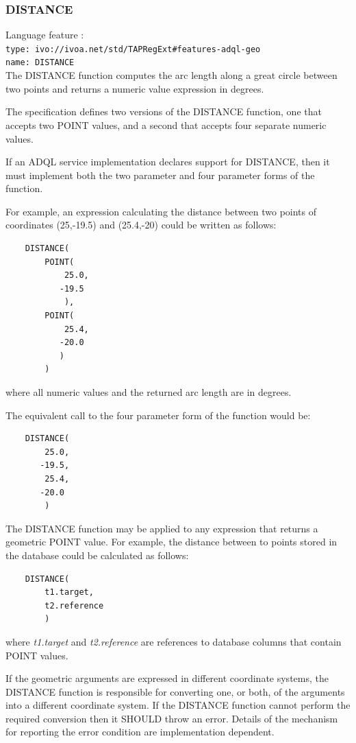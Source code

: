 \documentclass[11pt,a4paper]{ivoa}
\begin{document}
\subsubsection{DISTANCE}
\label{sec:functions.geom.distance}
{\footnotesize Language feature :}\\
{\footnotesize \verb|type: ivo://ivoa.net/std/TAPRegExt#features-adql-geo|}\\
{\footnotesize \verb|name: DISTANCE|}\\

The DISTANCE function computes the arc length along a great circle between two
points and returns a numeric value expression in degrees.

The specification defines two versions of the DISTANCE function, one that
accepts two POINT values, and a second that accepts four separate numeric
values.

If an ADQL service implementation declares support for DISTANCE,
then it must implement both the two parameter and four parameter
forms of the function.

For example, an expression calculating the distance between two points of
coordinates (25,-19.5) and (25.4,-20) could be written as follows:
\begin{verbatim}
    DISTANCE(
        POINT(
            25.0,
           -19.5
            ),
        POINT(
            25.4,
           -20.0
           )
        )
\end{verbatim}
\noindent
where all numeric values and the returned arc length are in degrees.

The equivalent call to the four parameter form of the function would be:
\begin{verbatim}
    DISTANCE(
        25.0,
       -19.5,
        25.4,
       -20.0
        )
\end{verbatim}

The DISTANCE function may be applied to any expression that returns a
geometric POINT value.
For example, the distance between to points stored in the database could
be calculated as follows:
\begin{verbatim}
    DISTANCE(
        t1.target,
        t2.reference
        )
\end{verbatim}
\noindent
where \textit{t1.target} and \textit{t2.reference} are references to
database columns that contain POINT values.

If the geometric arguments are expressed in different coordinate systems,
the DISTANCE function is responsible for converting one, or both, of the
arguments into a different coordinate system.
If the DISTANCE function cannot perform the required conversion then
it SHOULD throw an error.
Details of the mechanism for reporting the error condition are
implementation dependent.
\end{document}
